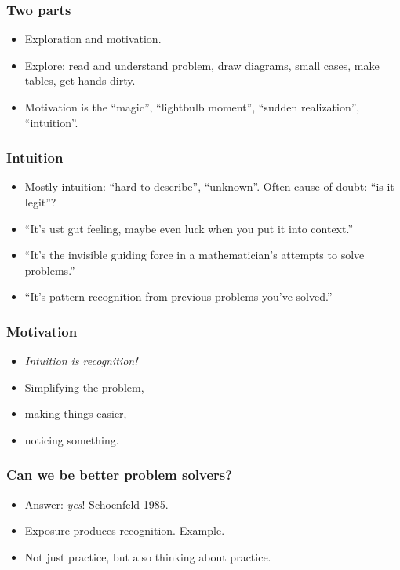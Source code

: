 \documentclass[serif, mathserif, professionalfont]{beamer}
\begin{document}
\begin{frame}
  \frametitle{Two parts}
  \begin{itemize}
    \item<2-> Exploration and motivation.
    \item<3-> Explore: read and understand problem, draw diagrams, small cases, make tables, get hands dirty.
    \item<4-> Motivation is the ``magic'', ``lightbulb moment'', ``sudden realization'', ``intuition''.
  \end{itemize}
\end{frame}

\begin{frame}
  \frametitle{Intuition}
  \begin{itemize}
    \item<2-> Mostly intuition: ``hard to describe'', ``unknown''. Often cause of doubt: ``is it legit''?
    \item<3-> ``It's ust gut feeling, maybe even luck when you put it into context.''
    \item<4-> ``It's the invisible guiding force in a mathematician's attempts to solve problems.''
    \item<5-> ``It's pattern recognition from previous problems you've solved.''
  \end{itemize}
\end{frame}

\begin{frame}
  \frametitle{Motivation}
  \begin{itemize}
    \item<2-> \emph{Intuition is recognition!}
    \item<3-> Simplifying the problem,
    \item<4-> making things easier,
    \item<5-> noticing something.
  \end{itemize}
\end{frame}

\begin{frame}
  \frametitle{Can we be better problem solvers?}
  \begin{itemize}
    \item<2-> Answer: \emph{yes}! Schoenfeld 1985.
    \item<3-> Exposure produces recognition. Example.
    \item<4-> Not just practice, but also thinking about practice.
  \end{itemize}
\end{frame}
\end{document}
